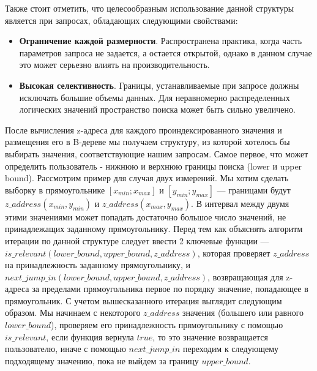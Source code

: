 Также стоит отметить, что целесообразным использование данной структуры является
при запросах, обладающих следующими свойствами:
\begin{itemize}
	\item \textbf{Ограничение каждой размерности}. Распространена практика, когда часть параметров запроса не задается, а остается открытой, однако в данном случае это может серьезно влиять на производительность.
	\item \textbf{Высокая селективность}. Границы, устанавливаемые при запросе должны исключать большие объемы данных. Для неравномерно распределенных логических значений пространство поиска может быть сильно увеличено.
\end{itemize}

После вычисления z-адреса для каждого проиндексированного значения и размещения его в B-дереве мы получаем структуру, из которой хотелось бы выбирать значения, соответствующие нашим запросам. Самое первое, что может определить пользователь - нижнюю и верхнюю границы поиска (lower и upper bound). Рассмотрим пример для случая двух измерений. Мы хотим сделать выборку в прямоугольнике $[x_{min};x_{max}]$ и $[y_{min}; y_{max}]$ --- границами будут $z\_address(x_{min}, y_{min})$ и $z\_address(x_{max}, y_{max})$. В интервал между двумя этими значениями может попадать достаточно большое число значений, не принадлежащих заданному прямоугольнику. Перед тем как объяснять алгоритм итерации по данной структуре следует ввести 2 ключевые функции --- $is\_relevant(lower\_bound, upper\_bound, z\_address)$, которая проверяет $z\_address$ на принадлежность заданному прямоугольнику, и $next\_jump\_in(lower\_bound, upper\_bound, z\_address)$, возвращающая для z-адреса за пределами прямоугольника первое по порядку значение, попадающее в прямоугольник.
С учетом вышесказанного итерация выглядит следующим образом. Мы начинаем с некоторого $z\_address$ значения (большего или равного $lower\_bound$), проверяем его принадлежность прямоугольнику с помощью  $is\_relevant$, если функция вернула $true$, то это значение возвращается пользователю, иначе с помощью $next\_jump\_in$ переходим к следующему подходящему значению, пока не выйдем за границу $upper\_bound$.

